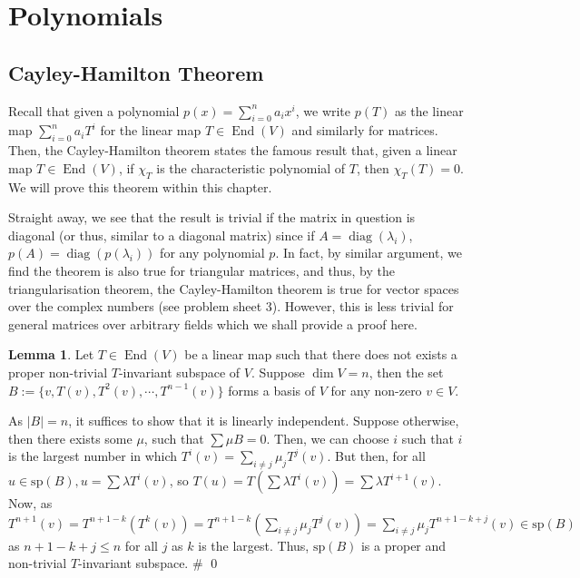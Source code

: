 \documentclass[
]{article}
\theoremstyle{definition}
\newtheorem{lemma}{Lemma}[section]
\theoremstyle{definition}
\begin{document}
\newpage

\hypertarget{polynomials}{%
\section{Polynomials}\label{polynomials}}

\hypertarget{cayley-hamilton-theorem}{%
\subsection{Cayley-Hamilton Theorem}\label{cayley-hamilton-theorem}}

Recall that given a polynomial \(p(x) = \sum_{i = 0}^n a_i x^i\), we
write \(p(T)\) as the linear map \(\sum_{i = 0}^n a_i T^i\) for the
linear map \(T \in \mathop{\mathrm{End}}(V)\) and similarly for
matrices. Then, the Cayley-Hamilton theorem states the famous result
that, given a linear map \(T \in \mathop{\mathrm{End}}(V)\), if
\(\chi_T\) is the characteristic polynomial of \(T\), then
\(\chi_T(T) = 0\). We will prove this theorem within this chapter.

Straight away, we see that the result is trivial if the matrix in
question is diagonal (or thus, similar to a diagonal matrix) since if
\(A = \mathop{\mathrm{diag}}(\lambda_i)\),
\(p(A) = \mathop{\mathrm{diag}}(p(\lambda_i))\) for any polynomial
\(p\). In fact, by similar argument, we find the theorem is also true
for triangular matrices, and thus, by the triangularisation theorem, the
Cayley-Hamilton theorem is true for vector spaces over the complex
numbers (see problem sheet 3). However, this is less trivial for general
matrices over arbitrary fields which we shall provide a proof here.

\begin{lemma}\label{no_proper}
  Let \(T \in \mathop{\mathrm{End}}(V)\) be a linear map such that there does not exists a proper 
  non-trivial \(T\)-invariant subspace of \(V\). Suppose \(\dim V = n\), then 
  the set \(B := \{v, T(v), T^2(v), \cdots, T^{n - 1}(v)\}\) forms a basis of 
  \(V\) for any non-zero \(v \in V\). 
\end{lemma}
\proof

As \(\left| B \right| = n\), it suffices to show that it is linearly
independent. Suppose otherwise, then there exists some \(\mu\), such
that \(\sum \mu B = 0\). Then, we can choose \(i\) such that \(i\) is
the largest number in which \(T^i(v) = \sum_{i \neq j} \mu_j T^j(v)\).
But then, for all \(u \in \text{sp}(B), u = \sum \lambda T^i(v)\), so
\(T(u) =  T(\sum \lambda T^i(v)) = \sum \lambda T^{i + 1}(v)\). Now, as
\(T^{n + 1}(v)  = T^{n + 1 - k}(T^k(v)) = T^{n + 1 - k}(\sum_{i \neq j} \mu_j T^j(v))  = \sum_{i \neq j} \mu_j T^{n + 1 - k + j}(v) \in \text{sp}(B)\)
as \(n + 1 - k + j \le n\) for all \(j\) as \(k\) is the largest. Thus,
\(\text{sp}(B)\) is a proper and non-trivial \(T\)-invariant subspace.
\# \qed
\end{document}
